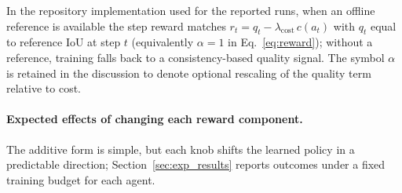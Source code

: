 \documentclass[letterpaper]{article}
\begin{document}
\noindent In the repository implementation used for the reported runs, when an offline reference is available the step reward matches $r_t = q_t - \lambda_{\mathrm{cost}}\, c(a_t)$ with $q_t$ equal to reference IoU at step $t$ (equivalently $\alpha{=}1$ in Eq.~\eqref{eq:reward}); without a reference, training falls back to a consistency-based quality signal. The symbol $\alpha$ is retained in the discussion to denote optional rescaling of the quality term relative to cost.

\paragraph{Expected effects of changing each reward component.}
The additive form is simple, but each knob shifts the learned policy in a predictable direction; Section~\ref{sec:exp_results} reports outcomes under a fixed training budget for each agent.
\end{document}
